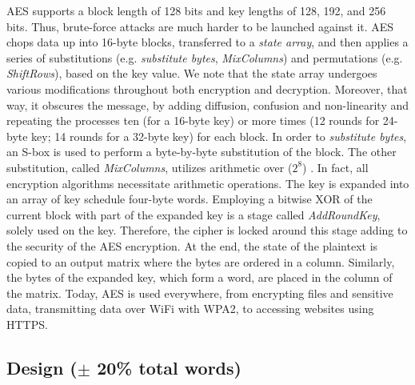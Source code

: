 AES supports a block length of 128 bits and key lengths of 128, 192, and 256 bits. Thus, brute-force attacks are much harder to be launched against it. AES chops data up into 16-byte blocks, transferred to a \emph{state array}, and then applies a series of substitutions (e.g. \emph{substitute bytes}, \emph{MixColumns}) and permutations (e.g. \emph{ShiftRows}), based on the key value. We note that the state array undergoes various modifications throughout both encryption and decryption. Moreover, that way, it obscures the message, by adding diffusion, confusion and non-linearity and repeating the processes ten (for a 16-byte key) or more times (12 rounds for 24-byte key; 14 rounds for a 32-byte key) for each block. In order to \emph{substitute bytes}, an S-box is used to perform a byte-by-byte substitution of the block. The other substitution, called \emph{MixColumns}, utilizes arithmetic over ($2^{8}$) \cite{stallings2017-a}. In fact, all encryption algorithms necessitate arithmetic operations. The key is expanded into an array of key schedule four-byte words. Employing a bitwise XOR of the current block with part of the expanded key is a stage called \emph{AddRoundKey}, solely used on the key. Therefore, the cipher is locked around this stage adding to the security of the AES encryption.  At the end, the state of the plaintext is copied to an output matrix where the bytes are ordered in a column. Similarly, the bytes of the expanded key, which form a word, are placed in the column of the matrix. Today, AES is used everywhere, from encrypting files and sensitive data, transmitting data over WiFi with WPA2, to accessing websites using HTTPS. 

\subsection{Design ($\pm$ 20\% total words)}

